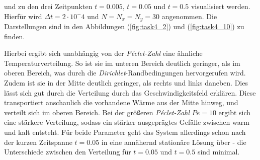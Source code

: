 \documentclass[12pt,a4paper,titlepage,headinclude,bibtotoc]{scrartcl}
\begin{document}
und zu den drei Zeitpunkten $t = 0.005$, $t = 0.05$ und $t=0.5$ visualisiert werden. Hierfür wird $\Delta t = 2 \cdot 10^-4$ und $N=N_x=N_y = 30$ angenommen. Die Darstellungen sind in den Abbildungen (\ref{fig:task4_2}) und (\ref{fig:task4_10}) zu finden.

Hierbei ergibt sich unabhängig von der \textit{Péclet-Zahl} eine ähnliche Temperaturverteilung. So ist sie im unteren Bereich deutlich geringer, als im oberen Bereich, was durch die \textit{Dirichlet}-Randbedingungen hervorgerufen wird. Zudem ist sie in der Mitte deutlich geringer, als rechts und links daneben. Dies lässt sich gut durch die Verteilung durch das Geschwindigkeitsfeld erklären. Diese transportiert anschaulich die vorhandene Wärme aus der Mitte hinweg, und verteilt sich im oberen Bereich. Bei der größeren \textit{Péclet-Zahl} $Pe=10$ ergibt sich eine stärkere Verteilung, sodass ein stärker ausgeprägtes Gefälle zwischen warm und kalt entsteht. Für beide Parameter geht das System allerdings schon nach der kurzen Zeitspanne $t = 0.05$ in eine annähernd stationäre Lösung über - die Unterschiede zwischen den Verteilung für $t=0.05$ und $t=0.5$ sind minimal. 
\end{document}
